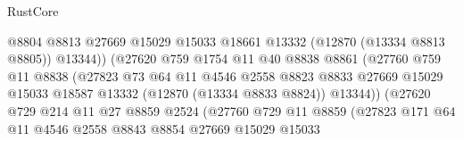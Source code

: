 \begin{lexlean}{RustCore}
\begin{coremodule}
                                      @8804
                                      @8813
                                      @27669
                                      @15029
                                      @15033
                                      @18661
                                      @13332
                                      (@12870 (@13334 @8813 @8805))
                                      @13344))
                                  (@27620
                                    @759
                                    @1754
                                    @11
                                    @40
                                    @8838
                                    @8861
                                    (@27760
                                      @759
                                      @11
                                      @8838
                                      (@27823
                                        @73
                                        @64
                                        @11
                                        @4546
                                        @2558
                                        @8823
                                        @8833
                                        @27669
                                        @15029
                                        @15033
                                        @18587
                                        @13332
                                        (@12870 (@13334 @8833 @8824))
                                        @13344))
                                    (@27620
                                      @729
                                      @214
                                      @11
                                      @27
                                      @8859
                                      @2524
                                      (@27760
                                        @729
                                        @11
                                        @8859
                                        (@27823
                                          @171
                                          @64
                                          @11
                                          @4546
                                          @2558
                                          @8843
                                          @8854
                                          @27669
                                          @15029
                                          @15033

\end{coremodule}
\end{lexlean}
